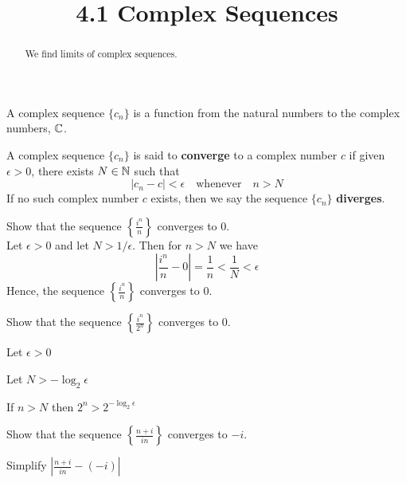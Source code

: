 \documentclass[handout]{ximera}
\title{4.1 Complex Sequences}
\begin{document}
\begin{abstract}
We find limits of complex sequences.
\end{abstract}

\maketitle


\begin{definition} 
A complex sequence $\{c_n\}$ is a function from the natural numbers to the complex numbers, $\mathbb C$.
\end{definition}

\begin{definition}
A complex sequence $\{c_n\}$ is said to {\bf converge} to a complex number $c$ if given $\epsilon >0$, there exists $N \in \mathbb N$
such that 
\[
|c_n - c| < \epsilon \quad \text{whenever} \quad n>N
\]
If no such complex number $c$ exists, then we say the sequence $\{c_n\}$ {\bf diverges}.
\end{definition}

 

\begin{example}[example 1]
Show that the sequence $\displaystyle \left\{\frac{i^n}{n}\right\}$ converges to $0$.\\
Let $\epsilon >0$ and let $N > 1/\epsilon$. Then for $n> N$ we have
\[
\left|\frac{i^n}{n} -0\right| = \frac{1}{n} < \frac{1}{N} < \epsilon
\]
Hence, the sequence $\displaystyle \left\{\frac{i^n}{n}\right\}$ converges to $0$.
\end{example}

\begin{problem}
Show that the sequence $\displaystyle \left\{\frac{i^n}{2^n}\right\}$ converges to $0$.
\begin{hint}
Let $\epsilon >0$
\end{hint}
\begin{hint}
Let $N > -\log_2\epsilon$
\end{hint}
\begin{hint}
If $n>N$ then $2^n > 2^{-\log_2\epsilon}$
\end{hint}
\end{problem}

\begin{problem}
Show that the sequence $\displaystyle \left\{\frac{n+i}{in}\right\}$ converges to $-i$.
\begin{hint}
Simplify $\displaystyle \left|\frac{n+i}{in} - (-i) \right|$
\end{hint}
\end{problem}
\end{document}
